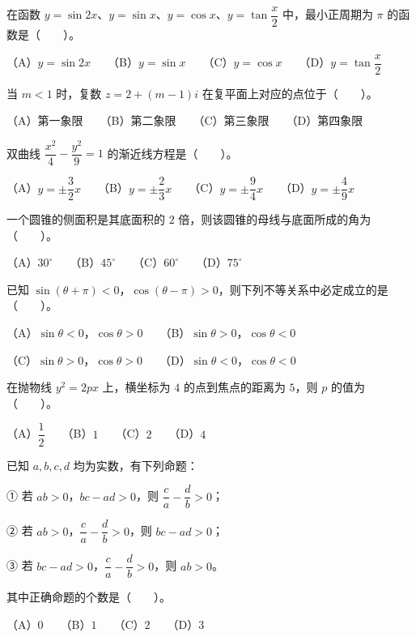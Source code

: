 \begin{question}
在函数 $y=\sin 2x$、$y=\sin x$、$y=\cos x$、$y=\tan\dfrac{x}{2}$ 中，最小正周期为 $\pi$ 的函数是\mbox{（　　）}。

（A）$y=\sin 2x$　　（B）$y=\sin x$　　（C）$y=\cos x$　　（D）$y=\tan\dfrac{x}{2}$

\end{question}
\begin{question}
当 $m<1$ 时，复数 $z=2+(m-1)i$ 在复平面上对应的点位于\mbox{（　　）}。

（A）第一象限　　（B）第二象限　　（C）第三象限　　（D）第四象限

\end{question}
\begin{question}
双曲线 $\dfrac{x^2}{4}-\dfrac{y^2}{9}=1$ 的渐近线方程是\mbox{（　　）}。

（A）$y=\pm\dfrac{3}{2}x$　　（B）$y=\pm\dfrac{2}{3}x$　　（C）$y=\pm\dfrac{9}{4}x$　　（D）$y=\pm\dfrac{4}{9}x$

\end{question}
\begin{question}
一个圆锥的侧面积是其底面积的 $2$ 倍，则该圆锥的母线与底面所成的角为\mbox{（　　）}。

（A）$30^\circ$　　（B）$45^\circ$　　（C）$60^\circ$　　（D）$75^\circ$

\end{question}
\begin{question}
已知 $\sin(\theta+\pi)<0$，$\cos(\theta-\pi)>0$，则下列不等关系中必定成立的是\mbox{（　　）}。

（A）$\sin\theta<0$，$\cos\theta>0$　　（B）$\sin\theta>0$，$\cos\theta<0$

（C）$\sin\theta>0$，$\cos\theta>0$　　（D）$\sin\theta<0$，$\cos\theta<0$

\end{question}
\begin{question}
在抛物线 $y^2=2px$ 上，横坐标为 $4$ 的点到焦点的距离为 $5$，则 $p$ 的值为\mbox{（　　）}。

（A）$\dfrac12$　　（B）$1$　　（C）$2$　　（D）$4$

\end{question}
\begin{question}
已知 $a,b,c,d$ 均为实数，有下列命题：

① 若 $ab>0$，$bc-ad>0$，则 $\dfrac{c}{a}-\dfrac{d}{b}>0$；

② 若 $ab>0$，$\dfrac{c}{a}-\dfrac{d}{b}>0$，则 $bc-ad>0$；

③ 若 $bc-ad>0$，$\dfrac{c}{a}-\dfrac{d}{b}>0$，则 $ab>0$。

其中正确命题的个数是\mbox{（　　）}。

（A）$0$　　（B）$1$　　（C）$2$　　（D）$3$

\end{question}
